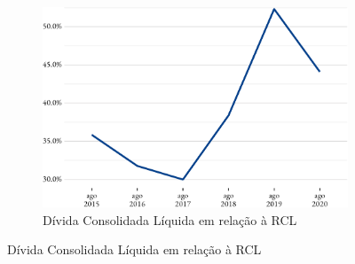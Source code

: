 \begin{figure}[!h]
\begin{subfigure}{\linewidth}
	\end{subfigure}
\end{figure}

\begin{figure}[!h]
	\begin{subfigure}{\linewidth}
		\caption{\label{fig:}Dívida Consolidada Líquida em relação à RCL}
		\includegraphics{fig/divida_rcl-1.pdf}
	\end{subfigure}
\end{figure}
